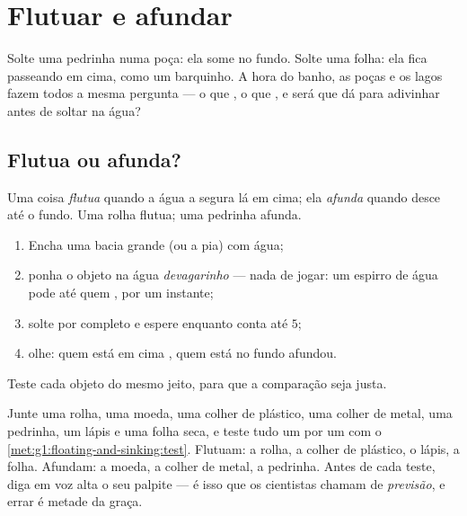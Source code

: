 \chapter{Flutuar e afundar}\label{ch:g1:floating-and-sinking}

Solte uma pedrinha numa poça: ela some no fundo. Solte uma folha: ela
fica passeando em cima, como um barquinho. A hora do banho, as poças
e os lagos fazem todos a mesma pergunta --- o que , o que
, e será que dá para adivinhar antes de soltar na água?

\section{Flutua ou afunda?}

\begin{definition}\label{def:g1:floating-and-sinking:words}
Uma coisa \emph{flutua} quando a água a segura lá em
cima; ela \emph{afunda} quando desce até o fundo. Uma
rolha flutua; uma pedrinha afunda.
\end{definition}

\begin{method}\label{met:g1:floating-and-sinking:test}
\begin{enumerate}
  \item Encha uma bacia grande (ou a pia) com água;
  \item ponha o objeto na água \emph{devagarinho} --- nada de jogar:
        um espirro de água pode  até quem , por um
        instante;
  \item solte por completo e espere enquanto conta até $5$;
  \item olhe: quem está em cima , quem está no fundo afundou.
\end{enumerate}
Teste cada objeto do mesmo jeito, para que a comparação seja justa.
\end{method}

\begin{example}\label{ex:g1:floating-and-sinking:sorting}
Junte uma rolha, uma moeda, uma colher de plástico, uma colher de
metal, uma pedrinha, um lápis e uma folha seca, e teste tudo um por
um com o \cref{met:g1:floating-and-sinking:test}. Flutuam: a rolha, a
colher de plástico, o lápis, a folha. Afundam: a moeda, a colher de
metal, a pedrinha. Antes de cada teste, diga em voz alta o seu
palpite --- é isso que os cientistas chamam de \emph{previsão}, e
errar é metade da graça.
\end{example}

